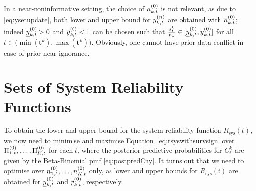 \documentclass[12pt, a4paper]{elsarticle}
\newcommand{\bs}[1]{\boldsymbol{#1}}
\renewcommand{\vec}[1]{{\bs#1}}
\newcommand{\Rsys}{R_\text{sys}}
\newcommand{\td}[1]{%
  \iftoggle{td}{%
    \todo[inline]{#1}%
  }{}%
}
\begin{document}
%
In a near-noninformative setting, the choice of $\underline{n}^{(0)}_{k,t}$ is not relevant,
as due to \eqref{eq:ysetupdate}, both lower and upper bound for $y^{(n)}_{k,t}$ are obtained with $\overline{n}^{(0)}_{k,t}$; 
indeed $\underline{y}^{(0)}_{k,t} > 0$ and $\overline{y}^{(0)}_{k,t} < 1$ can be chosen such that
$\frac{s^k_t}{n_k} \in [\underline{y}^{(0)}_{k,t}, \overline{y}^{(0)}_{k,t}]$ for all $t \in \big(\min(\vec{t}^k), \max(\vec{t}^k)\big)$.
Obviously, one cannot have prior-data conflict in case of prior near ignorance.


\section{Sets of System Reliability Functions}

To obtain the lower and upper bound for the system reliability function $\Rsys(t)$,
we now need to minimise and maximise Equation~\eqref{eq:rsyswithsurvsign} over $\Pi^{(0)}_{1,t}, \ldots, \Pi^{(0)}_{K,t}$ for each $t$,
where the posterior predictive probabilities for $C^k_t$ are given by the Beta-Binomial pmf \eqref{eq:postpredCny}.
It turns out that we need to optimise over $n^{(0)}_{1,t}, \ldots, n^{(0)}_{K,t}$ only, %
as lower and upper bounds for $\Rsys(t)$ are obtained for $\underline{y}^{(0)}_{k,t}$ and $\overline{y}^{(0)}_{k,t}$, respectively.
\end{document}
